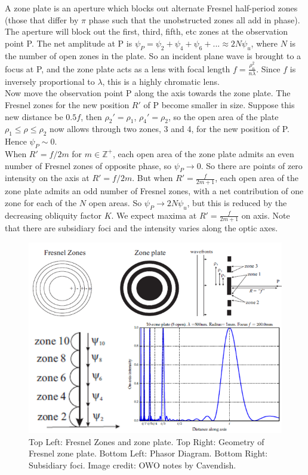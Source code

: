 \documentclass[a4paper]{article}
\begin{document}
\begin{Note}
A zone plate is an aperture which blocks out alternate Fresnel half-period zones (those that differ by $\pi$ phase such that the unobstructed zones all add in phase). The aperture will block out the first, third, fifth, etc zones at the observation point P. The net amplitude at P is $\psi_P=\psi_2+\psi_4+\psi_6+...\approx 2N\psi_u$, where $N$ is the number of open zones in the plate. So an incident plane wave is brought to a focus at P, and the zone plate acts as a lens with focal length $f=\frac{\rho_n^2}{n\lambda}$. Since $f$ is inversely proportional to $\lambda$, this is a highly chromatic lens.\\[5pt]
Now move the observation point P along the axis towards the zone plate. The Fresnel zones for the new position $R'$ of P become smaller in size. Suppose this new distance be $0.5f$, then $\rho_2'=\rho_1$, $\rho_4'=\rho_2$, so the open area of the plate $\rho_1\leq\rho\leq\rho_2$ now allows through two zones, 3 and 4, for the new position of P. Hence $\psi_P\sim 0$.\\[5pt]
When $R'=f/2m$ for $m\in\mathbb{Z^+}$, each open area of the zone plate admits an even number of Fresnel zones of opposite phase, so $\psi_P\rightarrow 0$. So there are points of zero intensity on the axis at $R'=f/2m$. But when $R'=\frac{f}{2m+1}$, each open area of the zone plate admits an odd number of Fresnel zones, with a net contribution of one zone for each of the $N$ open areas. So $\psi_P\rightarrow 2N\psi_u$, but this is  reduced by the decreasing obliquity factor $K$. We expect maxima at $R'=\frac{f}{2m+1}$ on axis. Note that there are subsidiary foci and the intensity varies along the optic axes.
\end{Note}
\begin{figure}[H]
    \centering
    \includegraphics[width=\linewidth]{fresnelzoneplate.PNG}
    \caption{Top Left: Fresnel Zones and zone plate. Top Right: Geometry of Fresnel zone plate. Bottom Left: Phasor Diagram. Bottom Right: Subsidiary foci. Image credit: OWO notes by Cavendish.}
\end{figure}
\newpage
\end{document}
